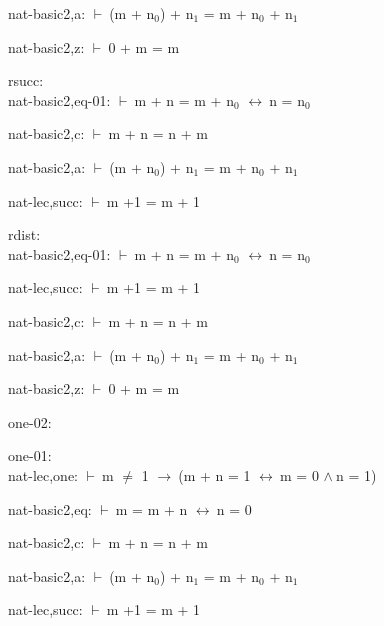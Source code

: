 \documentclass[a4paper]{article}
\newcommand{\Fol}{\mbox{$\vdash\ $}}
\newcommand{\And}{\mbox{$\wedge\ $}}
\newcommand{\Imp}{\mbox{$\rightarrow\ $}}
\newcommand{\Equiv}{\mbox{$\leftrightarrow\ $}}
\begin{document}
nat-basic2,a: 
 \Fol (m + $\mbox{n}_{0}$) + $\mbox{n}_{1}$ = m + $\mbox{n}_{0}$ + $\mbox{n}_{1}$



nat-basic2,z: 
 \Fol 0 + m = m



\bigskip

rsucc:\\ nat-basic2,eq-01: 
 \Fol m + n = m + $\mbox{n}_{0}$ \Equiv n = $\mbox{n}_{0}$



nat-basic2,c: 
 \Fol m + n = n + m



nat-basic2,a: 
 \Fol (m + $\mbox{n}_{0}$) + $\mbox{n}_{1}$ = m + $\mbox{n}_{0}$ + $\mbox{n}_{1}$



nat-lec,succ: 
 \Fol m +1 = m + 1



\bigskip

rdist:\\ nat-basic2,eq-01: 
 \Fol m + n = m + $\mbox{n}_{0}$ \Equiv n = $\mbox{n}_{0}$



nat-lec,succ: 
 \Fol m +1 = m + 1



nat-basic2,c: 
 \Fol m + n = n + m



nat-basic2,a: 
 \Fol (m + $\mbox{n}_{0}$) + $\mbox{n}_{1}$ = m + $\mbox{n}_{0}$ + $\mbox{n}_{1}$



nat-basic2,z: 
 \Fol 0 + m = m



\bigskip

one-02:\\ 

\bigskip

one-01:\\ nat-lec,one: 
 \Fol m $\neq$ 1 \Imp (m + n = 1 \Equiv m = 0 \And n = 1)



nat-basic2,eq: 
 \Fol m = m + n \Equiv n = 0



nat-basic2,c: 
 \Fol m + n = n + m



nat-basic2,a: 
 \Fol (m + $\mbox{n}_{0}$) + $\mbox{n}_{1}$ = m + $\mbox{n}_{0}$ + $\mbox{n}_{1}$



nat-lec,succ: 
 \Fol m +1 = m + 1
\end{document}
